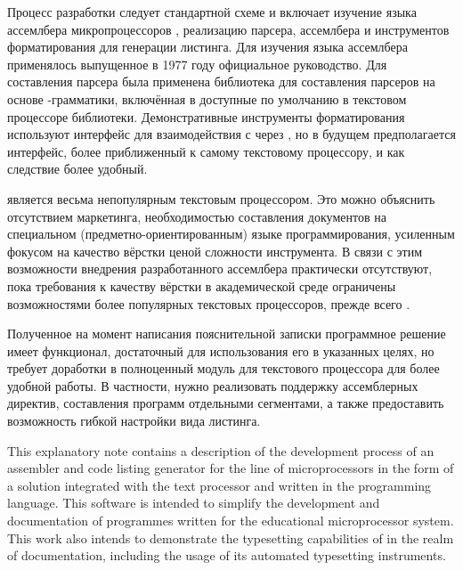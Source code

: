 Процесс разработки следует стандартной схеме и включает изучение языка
ассемлбера микропроцессоров , реализацию парсера, ассемлбера и
инструментов форматирования для генерации листинга. Для изучения языка
ассемлбера применялось выпущенное в 1977 году официальное руководство. Для
составления парсера была применена библиотека  для составления
парсеров на основе -грамматики, включённая в доступные по умолчанию в
текстовом процессоре  библиотеки. Демонстративные инструменты
форматирования используют интерфейс для взаимодействия с  через
, но в будущем предполагается интерфейс, более приближенный к самому
текстовому процессору, и как следствие более удобный.

 является весьма непопулярным текстовым процессором. Это можно
объяснить отсутствием маркетинга, необходимостью составления документов на
специальном (предметно-ориентированным) языке программирования, усиленным
фокусом на качество вёрстки ценой сложности инструмента. В связи с этим
возможности внедрения разработанного ассемлбера практически отсутствуют, пока
требования к качеству вёрстки в академической среде ограничены возможностями
более популярных текстовых процессоров, прежде всего .

Полученное на момент написания пояснительной записки программное решение имеет
функционал, достаточный для использования его в указанных целях, но требует
доработки в полноценный модуль для текстового процессора для более удобной
работы. В частности, нужно реализовать поддержку ассемблерных директив,
составления программ отдельными сегментами, а также предоставить возможность
гибкой настройки вида листинга.

\stopexcludedtitle

\startexcludedtitle[
    title={Annotation},
    reference={excludedtitle: annotation en},
]

This explanatory note contains a description of the development process of an
assembler and code listing generator for the  line of
microprocessors in the form of a solution integrated with the 
text processor and written in the  programming language. This
software is intended to simplify the development and documentation of
programmes written for the  educational microprocessor
system. This work also intends to demonstrate the typesetting capabilities of
 in the realm of documentation, including the usage of its
automated typesetting instruments.

